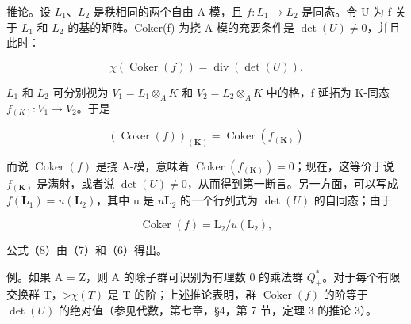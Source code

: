 推论。设 \(L_{1}\)、\(L_{2}\) 是秩相同的两个自由 A-模，且 \(f: L_{1} \to L_{2}\) 是同态。令 U 为 f 关于 \(L_{1}\) 和 \(L_{2}\) 的基的矩阵。Coker(f) 为挠 A-模的充要条件是 \(\det(U) \neq 0\)，并且此时：

\[
\chi (\operatorname{Coker} (f)) = \operatorname{div} (\det (U)).\tag{8}
\]

\(L_{1}\) 和 \(L_{2}\) 可分别视为 \(V_{1} = L_{1} \otimes_{A} K\) 和 \(V_{2} = L_{2} \otimes_{A} K\) 中的格，f 延拓为 K-同态 \(f_{(K)}: V_{1} \to V_{2}\)。于是

\[
\left(\operatorname{Coker} (f)\right) _ {(\mathbf {K})} = \operatorname{Coker} \left(f _ {(\mathbf {K})}\right)
\]

而说 \(\operatorname{Coker}(f)\) 是挠 A-模，意味着 \(\operatorname{Coker}(f_{(\mathbf{K})}) = 0\)；现在，这等价于说 \(f_{(\mathbf{K})}\) 是满射，或者说 \(\det(U) \neq 0\)，从而得到第一断言。另一方面，可以写成 \(f(\mathbf{L}_1) = u(\mathbf{L}_2)\)，其中 u 是 \(u\)\(\mathbf{L}_2\) 的一个行列式为 \(\det(U)\) 的自同态；由于

\[
\operatorname{Coker} (f) = \mathrm{L} _ {2} / u (\mathrm{L} _ {2}),
\]

公式（8）由（7）和（6）得出。

例。如果 A = Z，则 A 的除子群可识别为有理数 0 的乘法群 \(Q_{+}^{*}\)。对于每个有限交换群 T，\textgreater\(\chi(T)\) 是 T 的阶；上述推论表明，群 \(\operatorname{Coker}(f)\) 的阶等于 \(\det(U)\) 的绝对值（参见代数，第七章，§4，第 7 节，定理 3 的推论 3）。
